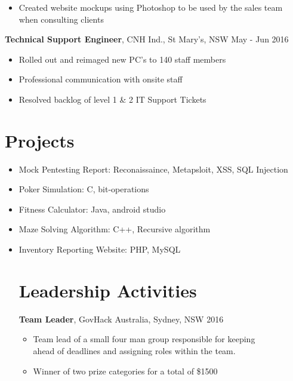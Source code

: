 \documentclass[margin]{res}
\begin{document}
\begin{resume}
\begin{itemize}
 \item Created website mockups using Photoshop to be used by the sales team \\
      when consulting clients
 \end{itemize}

{\bf Technical Support Engineer},
	CNH Ind., St Mary's, NSW \hfill  May - Jun 2016
\begin{itemize} \itemsep -2pt %
\item Rolled out and reimaged new PC's to 140 staff members
\item Professional communication with onsite staff
\item Resolved backlog of level 1 \& 2 IT Support Tickets
\end{itemize}

\section{Projects}
                  \begin{itemize} \itemsep -2pt
		  \item Mock Pentesting Report: Reconaissaince, Metapsloit, XSS, SQL Injection
                  \item Poker Simulation: C, bit-operations
                  \item Fitness Calculator: Java, android studio
                  \item Maze Solving Algorithm: C++, Recursive algorithm
                  \item Inventory Reporting Website: PHP, MySQL

\section{Leadership   Activities}
               {\bf Team Leader}, GovHack Australia, Sydney, NSW    \hfill        2016
                \begin{itemize} \itemsep -2pt
              \item Team lead of a small four man group responsible for keeping \\
                    ahead of deadlines and assigning roles within the team.

              \item Winner of two prize categories for a total of {\$}1500

		 \end{itemize}


\end{itemize}
\end{resume}
\end{document}
